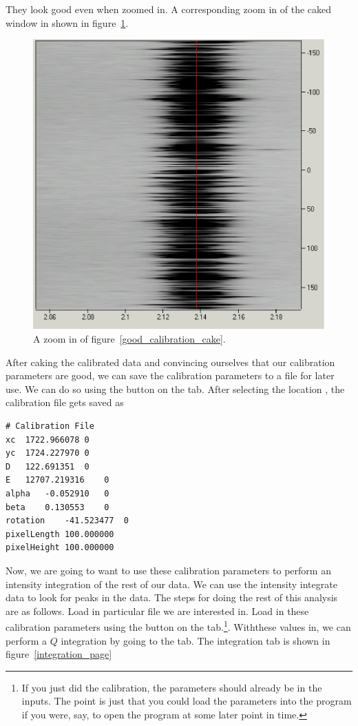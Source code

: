 They look good even when zoomed in. A corresponding zoom in of
the caked window in shown in 
figure~\ref{good_calibration_cake_zoom}.

\begin{figure}[h]
    \centering
    \includegraphics[scale=.75]{figures/good_calibration_cake_zoom.eps}
    \caption{A zoom in of figure~\ref{good_calibration_cake}.}
    \label{good_calibration_cake_zoom}
\end{figure}

After caking the calibrated data and convincing ourselves that
our calibration parameters are good, we can save the calibration
parameters to a file for later use. We can do so using the
 button on the  tab.
After selecting the location , the
calibration file gets saved as
\begin{lstlisting}[caption={'The Calibration Parameters File'}]
# Calibration File
xc	1722.966078	0
yc	1724.227970	0
D	122.691351	0
E	12707.219316	0
alpha	-0.052910	0
beta	0.130553	0
rotation	-41.523477	0
pixelLength	100.000000
pixelHeight	100.000000
\end{lstlisting}
Now, we are going to want to use these calibration
parameters to perform an intensity integration of the
rest of our data. We can use the intensity
integrate data to look for peaks in the data.
The steps for doing the rest of
this analysis are as follows. Load in particular file we
are interested in. Load in these calibration parameters
using the  button on the 
tab.\footnote{If you just did the calibration, the 
parameters should already be in the inputs. The point is
just that you could load the parameters into the program
if you were, say, to open the program at some later point
in time.}. Withthese values in, we can perform a $Q$
integration by going to the  tab.
The integration tab is shown in 
figure~\ref{integration_page}

